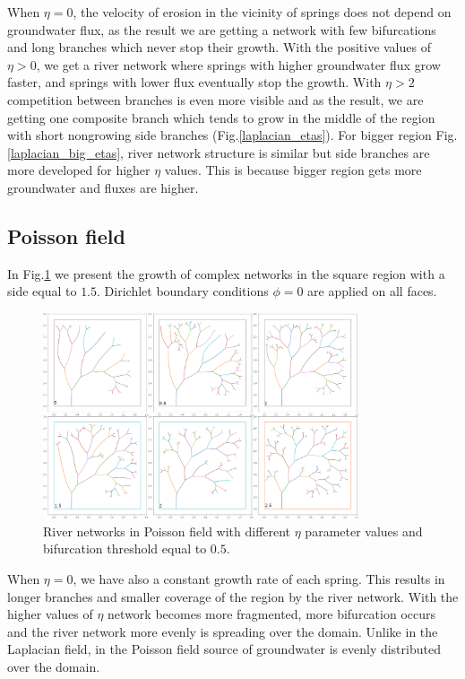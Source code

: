 \documentclass[]{pracamgr}
\begin{document}
        When $\eta = 0$, the velocity of erosion in the vicinity of springs does not depend on groundwater flux, as the result we are getting a network with few bifurcations and long branches which never stop their growth. With the positive values of $\eta > 0$, we get a river network where springs with higher groundwater flux grow faster, and springs with lower flux eventually stop the growth. With $\eta > 2$ competition between branches is even more visible and as the result, we are getting one composite branch which tends to grow in the middle of the region with short nongrowing side branches (Fig.\ref{laplacian_etas}). For bigger region Fig.\ref{laplacian_big_etas}, river network structure is similar but side branches are more developed for higher $\eta$ values. This is because bigger region gets more groundwater and fluxes are higher.
        \pagebreak

      \subsection{Poisson field}
        
        In Fig.\ref{poisson_etas} we present the growth of complex networks in the square region with a side equal to $1.5$. Dirichlet boundary conditions $\phi = 0$ are applied on all faces.

        \begin{figure}[H]
          \centering
          \includegraphics[width=0.83\textwidth]{figs/sims/poisson_field_etas.png}        
          \caption{River networks in Poisson field with different $\eta$ parameter values and bifurcation threshold equal to $0.5$.}
          \label{poisson_etas}
        \end{figure}

        When $\eta = 0$, we have also a constant growth rate of each spring. This results in longer branches and smaller coverage of the region by the river network. With the higher values of $\eta$ network becomes more fragmented, more bifurcation occurs and the river network more evenly is spreading over the domain. Unlike in the Laplacian field, in the Poisson field source of groundwater is evenly distributed over the domain.
\end{document}
